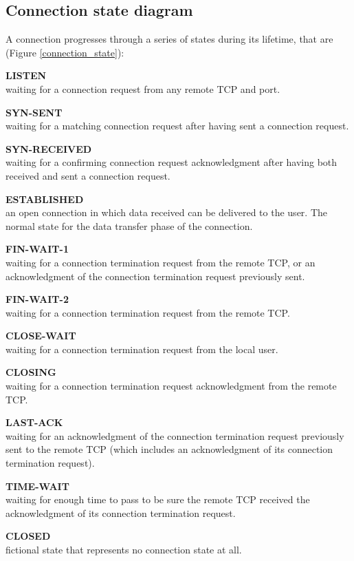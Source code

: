 \subsection{Connection state diagram}
A connection progresses through a series of states during its lifetime, that are (Figure \ref{connection_state}):
\begin{itemize}
\item{\textbf{LISTEN}\\
waiting for a connection request from any remote TCP and port.}
\item{\textbf{SYN-SENT}\\
waiting for a matching connection request after having sent a connection request.}
\item{\textbf{SYN-RECEIVED}\\
waiting for a confirming connection request acknowledgment after having both received and sent a connection request.}
\item{\textbf{ESTABLISHED}\\
an open connection in which data received can be delivered to the user.  The normal state for the data transfer phase of the connection.
\item{\textbf{FIN-WAIT-1}\\
waiting for a connection termination request from the remote TCP, or an acknowledgment of the connection termination request previously sent.}
\item{\textbf{FIN-WAIT-2}\\
waiting for a connection termination request from the remote TCP.}
\item{\textbf{CLOSE-WAIT}}\\
waiting for a connection termination request from the local user.}
\item{\textbf{CLOSING}\\
waiting for a connection termination request acknowledgment from the remote TCP.}
\item{\textbf{LAST-ACK}\\
waiting for an acknowledgment of the connection termination request previously sent to the remote TCP (which includes an acknowledgment of its connection termination request).}
\item{\textbf{TIME-WAIT}\\
waiting for enough time to pass to be sure the remote TCP received the acknowledgment of its connection termination request.}
\item{\textbf{CLOSED}\\
fictional state that represents no connection state at all.}
\end{itemize}


